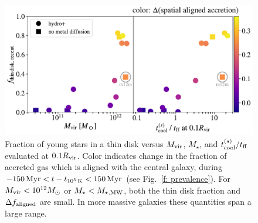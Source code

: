 \documentclass[fleqn,usenatbib]{mnras}
\newcommand{\tcon}{t_{10^5\,{\rm K}}}
\begin{document}
\begin{figure}
    \centering
    \includegraphics[width=\textwidth]{figures/prevalence/aligned_fraction_vs_galaxy_props.pdf}
    \caption{
    Fraction of young stars in a thin disk versus $M_{\rm vir}$, $M_\star$, and $t_{\rm cool}^{(s)}/t_{\rm ff}$ evaluated at $0.1 R_{\rm vir}$.
    Color indicates change in the fraction of accreted gas which is aligned with the central galaxy, during $-150\,{\rm Myr} < t-\tcon < 150\,{\rm Myr}$ (see Fig.~\ref{f: prevalence}).
    For $M_{\rm vir} < 10^{12} M_\odot$ or $M_\star < M_{\star, {\rm MW}}$, both the thin disk fraction and $\Delta f_{\rm aligned}$ are small.
    In more massive galaxies these quantities span a large range.
    }
    \label{f: prevalence vs galaxy properties}
\end{figure}

\newcommand{\tcoolsh}{t_{\rm cool}^{(s)}}
\newcommand{\tff}{t_{\rm ff}}
\newcommand{\Mvir}{M_{\rm vir}}
\end{document}
